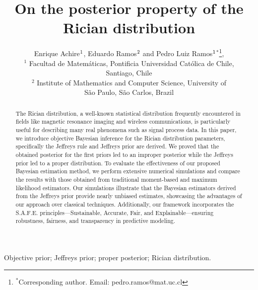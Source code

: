 \documentclass[12pt]{interact}
\theoremstyle{plain}%
\theoremstyle{definition}
\theoremstyle{remark}
\begin{document}

\title{On the posterior property of the Rician distribution}

\author{ Enrique Achire$^{\rm 1}$, Eduardo Ramos$^{\rm 2}$ and  Pedro Luiz Ramos$^{\rm 1}$$^{\ast}$\thanks{$^\ast$Corresponding author. Email: pedro.ramos@mat.uc.cl
\vspace{6pt}}, \\\vspace{6pt} 
\normalsize{$^{1}$ Facultad de Matemáticas, Pontificia Universidad Católica de Chile, \\ Santiago, Chile} \\  
\normalsize{$^{2}$ Institute of Mathematics and Computer Science, University of \\ S\~ao Paulo, S\~ao Carlos, Brazil}
}



\maketitle

\begin{abstract}
The Rician distribution, a well-known statistical distribution frequently encountered in fields like magnetic resonance imaging and wireless communications, is particularly useful for describing many real phenomena such as signal process data. In this paper, we introduce objective Bayesian inference for the Rician distribution parameters, specifically the Jeffreys rule and Jeffreys prior are derived. We proved that the obtained posterior for the first priors led to an improper posterior while the Jeffreys prior led to a proper distribution.
To evaluate the effectiveness of our proposed Bayesian estimation method, we perform extensive numerical simulations and compare the results with those obtained from traditional moment-based and maximum likelihood estimators. Our simulations illustrate that the Bayesian estimators derived from the Jeffreys prior provide nearly unbiased estimates, showcasing the advantages of our approach over classical techniques. Additionally, our framework incorporates the S.A.F.E. principles—Sustainable, Accurate, Fair, and Explainable—ensuring robustness, fairness, and transparency in predictive modeling.
\end{abstract}

\begin{keywords}
Objective prior;  Jeffreys prior; proper posterior; Rician distribution.
\end{keywords}
\end{document}
